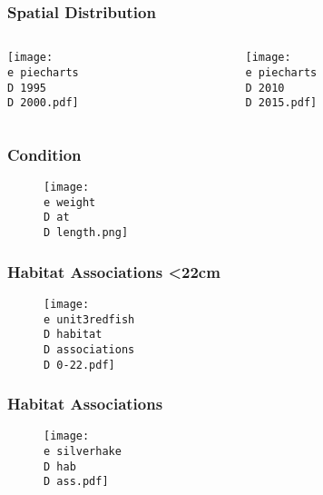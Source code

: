 \documentclass{beamer}
\begin{document}
\begin{frame}
\frametitle{Spatial Distribution}
\begin{columns}
	\begin{column}{.48\textwidth}
		\centerline{\texttt{[image: \\e piecharts\\D 1995\\D 2000.pdf]}}
	\end{column}

	\begin{column}{0.48\textwidth}
	\begin{figure}

 		\centerline{\texttt{[image: \\e piecharts\\D 2010\\D 2015.pdf]}}

 \end{figure}
 \end{column}
 \end{columns}
\end{frame}

\begin{frame}
\frametitle{Condition}
\vspace*{-0.3cm}
\begin{figure}

 \centerline{\texttt{[image: \\e weight\\D at\\D length.png]}}

 \end{figure}
 \end{frame}

\begin{frame}
\frametitle{Habitat Associations \textless 22cm}
\vspace*{-0.3cm}
\begin{figure}

 \centerline{\texttt{[image: \\e unit3redfish\\D habitat\\D associations\\D 0-22.pdf]}}

 \end{figure}
 \end{frame}


\begin{frame}
\frametitle{Habitat Associations}
\vspace*{-0.3cm}
\begin{figure}

 \centerline{\texttt{[image: \\e silverhake\\D hab\\D ass.pdf]}}

 \end{figure}
 \end{frame}
\end{document}
